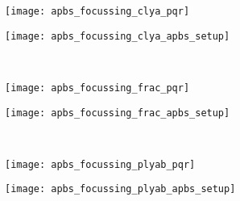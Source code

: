\begin{figure*}[t]
  \centering
  \medskip
  \begin{minipage}[t]{120mm}
    \centering
    \begin{subfigure}[t]{50mm}
      \centering
      \caption{}\vspace{-5mm}\hspace{1.5mm}\label{fig:apbs_focussing_clya_pqr}
      \texttt{[image: apbs\_focussing\_clya\_pqr]}
    \end{subfigure}
    \hspace{2mm}
    \begin{subfigure}[t]{55mm}
      \centering
      \caption{}\vspace{-5mm}\hspace{1.5mm}\label{fig:apbs_focussing_clya_apbs_setup}
      \texttt{[image: apbs\_focussing\_clya\_apbs\_setup]}
    \end{subfigure}
  \end{minipage}
  \\ \vspace{4mm}
  \begin{minipage}[t]{120mm}
    \centering
    \begin{subfigure}[t]{50mm}
      \centering
      \caption{}\vspace{-5mm}\hspace{1.5mm}\label{fig:apbs_focussing_frac_pqr}
      \texttt{[image: apbs\_focussing\_frac\_pqr]}
    \end{subfigure}
    \hspace{2mm}
    \begin{subfigure}[t]{55mm}
      \centering
      \caption{}\vspace{-5mm}\hspace{1.5mm}\label{fig:apbs_focussing_frac_apbs_setup}
      \texttt{[image: apbs\_focussing\_frac\_apbs\_setup]}
    \end{subfigure}
  \end{minipage}
  \\ \vspace{4mm}
  \begin{minipage}[t]{120mm}
    \centering
    \begin{subfigure}[t]{50mm}
      \centering
      \caption{}\vspace{-5mm}\hspace{1.5mm}\label{fig:apbs_focussing_plyab_pqr}
      \texttt{[image: apbs\_focussing\_plyab\_pqr]}
    \end{subfigure}
    \hspace{2mm}
    \begin{subfigure}[t]{55mm}
      \centering
      \caption{}\vspace{-5mm}\hspace{1.5mm}\label{fig:apbs_focussing_plyab_apbs_setup}
      \texttt{[image: apbs\_focussing\_plyab\_apbs\_setup]}
    \end{subfigure}
  \end{minipage}


\end{figure*}

